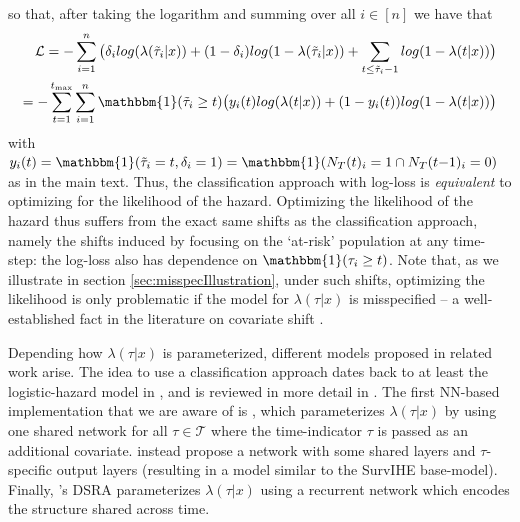 \documentclass{article}
\newcommand{\Tc}{{\mathcal T}}
\newcommand{\one}{{\mathbbm{1}}}
\newcommand{\minus}{{-}} %
\newcommand{\tmax}{{t_{\text{max}}}}
\begin{document}
so that, after taking the logarithm and summing over all $i\in [n]$ we have that
\begin{equation} \label{eq:loss_longformat}
\begin{split}
\mathcal{L} =  - \sum^n_{i=1} \big(\delta_i log(\lambda(\tilde{\tau}_i|x))+(1-\delta_i)log(1-\lambda(\tilde{\tau}_i|x)) + \sum_{t \leq \tilde{\tau}_i-1} log(1-\lambda(t|x))\big)\\
=-  \sum^\tmax_{t=1} \sum^n_{i=1} \one(\tilde{\tau}_i \geq t) \big(y_i(t) log(\lambda(t|x))+(1-y_i(t))log(1-\lambda(t|x))\big)
\end{split}
\end{equation}
with $y_i(t)=\one(\tilde{\tau}_i=t, \delta_i=1) = \one(N_{T}(t)_i=1 \cap N_{T}(t\minus 1)_i=0)$ as in the main text. Thus, the classification approach with log-loss is \textit{equivalent} to optimizing for the likelihood of the hazard. Optimizing the likelihood of the hazard thus suffers from the exact same shifts as the classification approach, namely the shifts induced by focusing on the `at-risk' population at any time-step: the log-loss also has dependence on $\one(\tau_i \geq t)$. Note that, as we illustrate in section \ref{sec:misspecIllustration}, under such shifts, optimizing the likelihood is only problematic if the model for $\lambda(\tau|x)$ is misspecified -- a well-established fact in the literature on covariate shift \cite{shimodaira2000improving}.

Depending how $\lambda(\tau|x)$ is parameterized, different models proposed in related work arise. The idea to use a classification approach dates back to at least the logistic-hazard model in \cite{brown1975use}, and is reviewed in more detail in \cite{tutz2016modeling}. The first NN-based implementation that we are aware of is \cite{biganzoli1998feed}, which parameterizes $\lambda(\tau|x)$ by using one shared network for all $\tau \in \Tc$ where the time-indicator $\tau$ is passed as an additional covariate. \cite{gensheimer2019scalable} instead propose a network with some shared layers and $\tau$-specific output layers (resulting in a model similar to the SurvIHE base-model). Finally, \cite{ren2017dsra}'s DSRA parameterizes $\lambda(\tau|x)$ using a recurrent network which encodes the structure shared across time.
\end{document}
